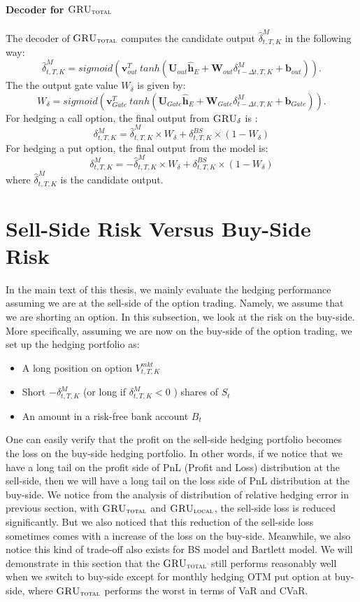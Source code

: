 \documentclass[letterpaper,12pt,titlepage,oneside,final]{book}
\numberwithin{equation}{section}
\theoremstyle{definition}
\newcommand{\model}{\textsc{GRU}_\delta}
\newcommand{\modelT}{\textsc{GRU}_{\textsc{total}}}
\newcommand{\modelL}{\textsc{GRU}_{\textsc{local}}}
\newcommand{\vb}{\mathbf{b}}
\newcommand{\DT}{\Delta t}
\newcommand{\vv}{\mathbf{v}}
\newcommand{\vW}{\pmb{W}}
\newcommand{\vU}{\pmb{U}}
\newcommand{\Vmkt}{V^{mkt}}
\newcommand{\Smkt}{S}
\begin{document}
\subsubsection{Decoder for $\modelT$}
 The decoder of $\modelT$ computes the candidate output  $\widehat{\delta}^M_{t,T,K}$ in the following way:
\[
\widehat{\delta}^M_{t,T,K}=sigmoid (\vv^T_{out} \ tanh( \vU_{out} \mathbf{\widehat{h}}_E + \vW_{out} \delta^M_{t-\DT,T,K}+ \vb_{out})).
\]
The the output gate value $W_{\delta}$ is given by:
\[
W_{\delta}=sigmoid (\vv^T_{Gate} \ tanh( \vU_{Gate} \mathbf{\widehat{h}}_E + \vW_{Gate} \delta^M_{t-\DT,T,K}+ \vb_{Gate})).
\]
For hedging a call option, the final output from $\model$ is :
\[
\delta^M_{t,T,K}=\widehat{\delta}^M_{t,T,K} \times W_{\delta} +\delta^{BS}_{t,T,K} \times (1-W_{\delta})
\]
For hedging a put option, the final output from the model is:
\[
\delta^M_{t,T,K}=-\widehat{\delta}^M_{t,T,K} \times W_{\delta} +\delta^{BS}_{t,T,K} \times (1-W_{\delta})
\]
where $\widehat{\delta}^M_{t,T,K}$ is the candidate output.

\chapter{Sell-Side Risk Versus Buy-Side Risk}\label{app:BuySide}
In the main text of this thesis, we mainly evaluate the hedging performance assuming we are at the sell-side of the option trading. Namely, we assume that we are shorting an option. In this subsection, we look at the risk on the buy-side.  More specifically, assuming we are now on the buy-side of the option trading, we set up the hedging portfolio as:
\begin{itemize}
	\item A long position on option $\Vmkt_{t,T,K}$
	\item Short $-\delta^{M}_{t,T,K}$ (or long if $\delta^{M}_{t,T,K}<0$ ) shares of $\Smkt_t$
	\item An amount in a risk-free bank account $B_t$
\end{itemize}

 One can easily verify that the profit  on the sell-side  hedging portfolio becomes the loss on the  buy-side hedging portfolio. In other words, if we notice that we have a long tail on the profit side of PnL (Profit and Loss) distribution at the sell-side, then we will have a long tail on the loss side of PnL distribution at the buy-side. We notice from the analysis of distribution of relative hedging error in previous section, with $\modelT$ and $\modelL$, the sell-side loss is reduced significantly. But we also noticed that this reduction of the sell-side loss sometimes comes with a increase of the loss on the buy-side. Meanwhile, we also notice this kind of trade-off also exists for BS model and Bartlett model. We will demonstrate in this section that the $\modelT$ still performs reasonably well when we switch to buy-side except for monthly hedging OTM put option at buy-side, where $\modelT$ performs the worst in terms of VaR and CVaR. 
\end{document}
